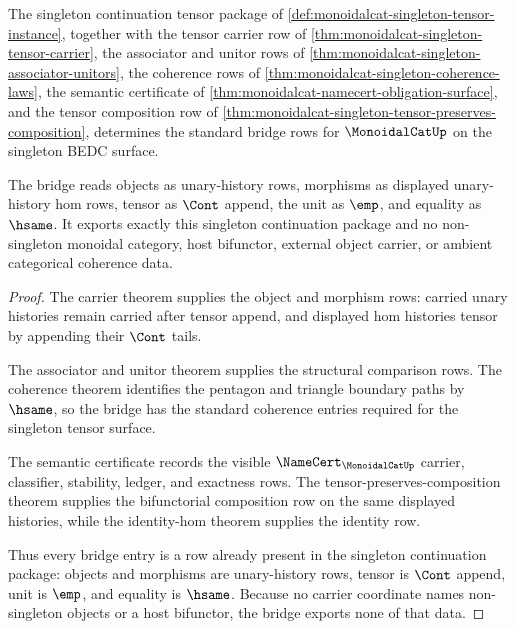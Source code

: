 \begin{theorem}
\label{thm:monoidalcat-singleton-standard-bridge}
The singleton continuation tensor package of \autoref{def:monoidalcat-singleton-tensor-instance}, together with the tensor carrier row of \autoref{thm:monoidalcat-singleton-tensor-carrier}, the associator and unitor rows of \autoref{thm:monoidalcat-singleton-associator-unitors}, the coherence rows of \autoref{thm:monoidalcat-singleton-coherence-laws}, the semantic certificate of \autoref{thm:monoidalcat-namecert-obligation-surface}, and the tensor composition row of \autoref{thm:monoidalcat-singleton-tensor-preserves-composition}, determines the standard bridge rows for $\MonoidalCatUp$ on the singleton BEDC surface.

The bridge reads objects as unary-history rows, morphisms as displayed unary-history hom rows, tensor as $\Cont$ append, the unit as $\emp$, and equality as $\hsame$. It exports exactly this singleton continuation package and no non-singleton monoidal category, host bifunctor, external object carrier, or ambient categorical coherence data.
\end{theorem}
\begin{proof}
The carrier theorem supplies the object and morphism rows: carried unary histories remain carried after tensor append, and displayed hom histories tensor by appending their $\Cont$ tails.

The associator and unitor theorem supplies the structural comparison rows. The coherence theorem identifies the pentagon and triangle boundary paths by $\hsame$, so the bridge has the standard coherence entries required for the singleton tensor surface.

The semantic certificate records the visible $\NameCert_{\MonoidalCatUp}$ carrier, classifier, stability, ledger, and exactness rows. The tensor-preserves-composition theorem supplies the bifunctorial composition row on the same displayed histories, while the identity-hom theorem supplies the identity row.

Thus every bridge entry is a row already present in the singleton continuation package: objects and morphisms are unary-history rows, tensor is $\Cont$ append, unit is $\emp$, and equality is $\hsame$. Because no carrier coordinate names non-singleton objects or a host bifunctor, the bridge exports none of that data.
\end{proof}

